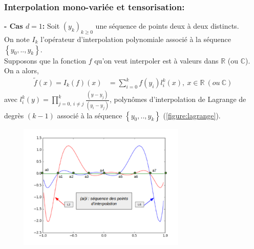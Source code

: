 \subsubsection{Interpolation mono-variée et tensorisation:}\label{sec:4.1.1}
\hspace{0.5cm}
\textbf{ - Cas $d=1$: }
Soit $(y_k)_{k \geq 0}$ une séquence de points deux à deux distincts. \\
On note $I_k$ l'opérateur d'interpolation polynomiale associé à la séquence $\left \{ y_0, .. , y_k \right \}$. \\
Supposons que la fonction $f$ qu'on veut interpoler est à valeurs dans $\mathbb{R}$ (ou $\mathbb{C}$).\\
On a alors,
\begin{align}
   \tilde{f}(x) = I_k(f)(x) & = \sum_{i=0}^k f(y_i) l_i^k(x),\ x \in \mathbb{R}\ (ou\ \mathbb{C}) \nonumber
\end{align}
avec $l_i^k(y) = \prod_{j=0,\ i \neq j}^k \frac{(y - y_j)}{(y_i - y_j)}$, polynômes d'interpolation de Lagrange
de degrès $(k-1)$ associé à la séquence $\left \{ y_0, .. , y_k \right \}$ (\ref{figure:lagrange}).\\
\begin{center}
\includegraphics[height=6cm,width=10cm]{images/lagrange_polynomials.png}
\label{figure:lagrange}
\end{center}

